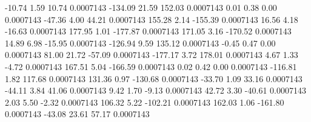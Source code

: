       -10.74        1.59       10.74     0.0007143
     -134.09       21.59      152.03     0.0007143
        0.01        0.38        0.00     0.0007143
      -47.36        4.00       44.21     0.0007143
      155.28        2.14     -155.39     0.0007143
       16.56        4.18      -16.63     0.0007143
      177.95        1.01     -177.87     0.0007143
      171.05        3.16     -170.52     0.0007143
       14.89        6.98      -15.95     0.0007143
     -126.94        9.59      135.12     0.0007143
       -0.45        0.47        0.00     0.0007143
       81.00       21.72      -57.09     0.0007143
     -177.17        3.72      178.01     0.0007143
        4.67        1.33       -4.72     0.0007143
      167.51        5.04     -166.59     0.0007143
        0.02        0.42        0.00     0.0007143
     -116.81        1.82      117.68     0.0007143
      131.36        0.97     -130.68     0.0007143
      -33.70        1.09       33.16     0.0007143
      -44.11        3.84       41.06     0.0007143
        9.42        1.70       -9.13     0.0007143
       42.72        3.30      -40.61     0.0007143
        2.03        5.50       -2.32     0.0007143
      106.32        5.22     -102.21     0.0007143
      162.03        1.06     -161.80     0.0007143
      -43.08       23.61       57.17     0.0007143
